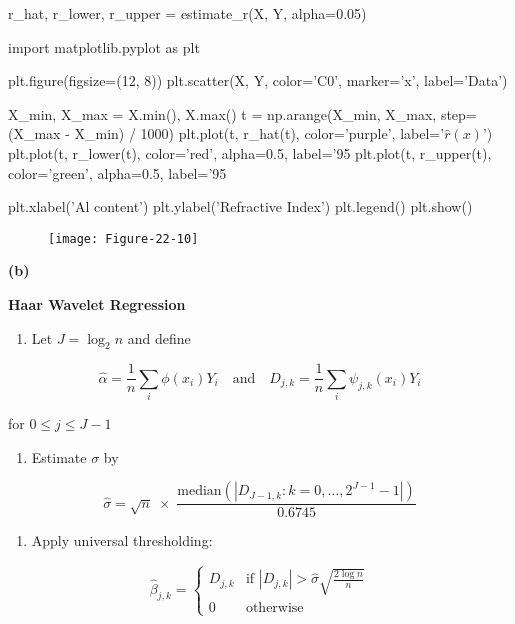 \begin{python}
r_hat, r_lower, r_upper = estimate_r(X, Y, alpha=0.05)
\end{python}

\begin{python}
import matplotlib.pyplot as plt

plt.figure(figsize=(12, 8))
plt.scatter(X, Y, color='C0', marker='x', label='Data')

X_min, X_max = X.min(), X.max()
t = np.arange(X_min, X_max, step=(X_max - X_min) / 1000)
plt.plot(t, r_hat(t), color='purple', label='$\hat{r}(x)$')
plt.plot(t, r_lower(t), color='red', alpha=0.5, label='95%
plt.plot(t, r_upper(t), color='green', alpha=0.5, label='95%

plt.xlabel('Al content')
plt.ylabel('Refractive Index')
plt.legend()
plt.show()
\end{python}

\begin{figure}[H]
\texttt{[image: Figure-22-10]}
\end{figure}

\textbf{(b)}

\textbf{Haar Wavelet Regression}

\begin{enumerate}[tightlist,label={\arabic*.}]
\item
  Let \(J = \log_2 n\) and define
\end{enumerate}

\[ \hat{\alpha} = \frac{1}{n} \sum_i \phi(x_i) Y_i
\quad \text{and} \quad
D_{j, k} = \frac{1}{n} \sum_i \psi_{j, k}(x_i) Y_i
\]

for \(0 \leq j \leq J - 1\)

\begin{enumerate}[tightlist,label={\arabic*.}]
\item
  Estimate \(\sigma\) by
\end{enumerate}

\[ \hat{\sigma} = \sqrt{n} \; \times \; \frac{\text{median} \left( \left| D_{J-1, k} : k = 0, \dots, 2^{J - 1} - 1\right| \right)}{0.6745} \]

\begin{enumerate}[tightlist,label={\arabic*.},resume]
\item
  Apply universal thresholding:
\end{enumerate}

\[ \hat{\beta}_{j, k} = \begin{cases}
D_{j, k} & \text{if } \left| D_{j, k} \right| > \hat{\sigma} \sqrt{\frac{2 \log n}{n}} \\
0 & \text{otherwise}
\end{cases}\]

